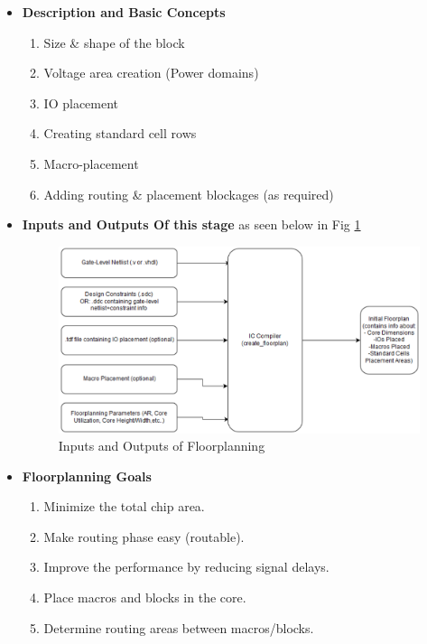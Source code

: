 \documentclass[../main.tex]{subfiles}
\begin{document}
\begin{itemize}
\item \textbf{Description and Basic Concepts}
		
\begin{enumerate}
\item Size & shape of the block
\item Voltage area creation (Power domains)
\item IO placement
\item Creating standard cell rows
\item Macro-placement
\item Adding routing & placement blockages (as required)
\end{enumerate}

\item \textbf{Inputs and Outputs Of this stage}  as seen below in Fig \ref{fig:IO_floorplaning}
	
\begin{figure}[h]
\centering
\includegraphics[width=17cm]{diagrams/IO_floorplaning.PNG}
\caption{ Inputs and Outputs of Floorplanning}
\label{fig:IO_floorplaning}
\end{figure}

\item \textbf{Floorplanning Goals}

\begin{enumerate}
\item Minimize the total chip area.
\item Make routing phase easy (routable).
\item Improve the performance by reducing signal delays.
\item Place macros and blocks in the core.
\item Determine routing areas between macros/blocks.
\end{enumerate}
\end{itemize}
\end{document}
